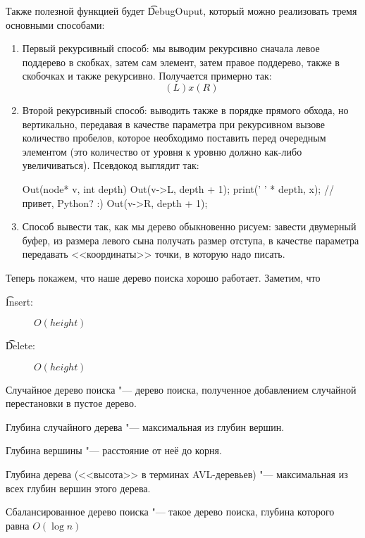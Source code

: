 Также полезной функцией будет \t{DebugOuput}, который можно реализовать тремя основными способами:
\begin{enumerate}
\item
	Первый рекурсивный способ: мы выводим рекурсивно сначала левое поддерево в скобках,
	затем сам элемент, затем правое поддерево, также в скобочках и также рекурсивно.
	Получается примерно так:
	\[ (L) x (R) \]
\item
	Второй рекурсивный способ: выводить также в порядке прямого обхода, но вертикально,
	передавая в качестве параметра при рекурсивном вызове количество пробелов, 
	которое необходимо поставить перед очередным элементом 
	(это количество от уровня к уровню должно как-либо увеличиваться). 
	Псевдокод выглядит так:
\begin{cppcode}
Out(node* v, int depth) {
	Out(v->L, depth + 1);
	print(' ' * depth, x); //привет, Python? :)
	Out(v->R, depth + 1);
}
\end{cppcode}
\item 
	Способ вывести так, как мы дерево обыкновенно рисуем: завести двумерный буфер, 
	из размера левого сына получать размер отступа, в качестве параметра 
	передавать <<координаты>> точки, в которую надо писать.
\end{enumerate}

Теперь покажем, что наше дерево поиска хорошо работает. Заметим, что
\begin{description}
	\item[\t{Insert}:] $O(height)$
	\item[\t{Delete}:] $O(height)$
\end{description}

\begin{Def}
	Случайное дерево поиска "--- дерево поиска, полученное добавлением 
	случайной перестановки в пустое дерево.
\end{Def}

\begin{Def}
	Глубина случайного дерева "--- максимальная из глубин вершин.
\end{Def}
\begin{Def}
	Глубина вершины "--- расстояние от неё до корня.
\end{Def}
\begin{Def}
	Глубина дерева (<<высота>> в терминах AVL-деревьев) "--- максимальная из всех глубин
	вершин этого дерева.
\end{Def}

\begin{Def}
	Сбалансированное дерево поиска "--- такое дерево поиска, глубина которого равна $O(\log n)$
\end{Def}

